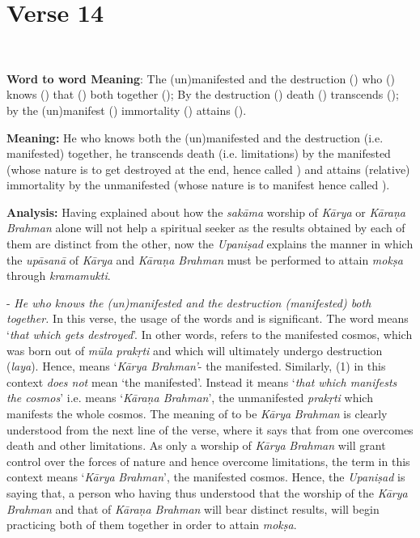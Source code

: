 \chapter{Verse 14}

\begin{moolashloka}
\\
\end{moolashloka}

\textbf{Word to word Meaning}: The (un)manifested and the destruction () who () knows () that () both together (); By the destruction () death () transcends (); by the (un)manifest () immortality () attains ().

\textbf{Meaning:} He who knows both the (un)manifested and the destruction (i.e. manifested) together, he transcends death (i.e. limitations) by the manifested (whose nature is to get destroyed at the end, hence called ) and attains (relative) immortality by the unmanifested (whose nature is to manifest hence called ).

\textbf{Analysis:} Having explained about how the \emph{sakāma} worship of \emph{Kārya} or \emph{Kāraṇa Brahman} alone will not help a spiritual seeker as the results obtained by each of them are distinct from the other, now the \emph{Upaniṣad} explains the manner in which the \emph{upāsanā} of \emph{Kārya} and \emph{Kāraṇa Brahman} must be performed to attain \emph{mokṣa} through \emph{kramamukti}.

- \emph{He who knows the (un)manifested and the destruction (manifested) both together.} In this verse, the usage of the words  and  is significant. The word  means `\emph{that which gets destroyed}'. In other words,  refers to the manifested cosmos, which was born out of \emph{mūla prakṛti} and which will ultimately undergo destruction (\emph{laya}). Hence,  means `\emph{Kārya} \emph{Brahman'}- the manifested. Similarly,  (1) in this context \emph{does not} mean `the manifested'. Instead it means `\emph{that which manifests the cosmos}' i.e.  means `\emph{Kāraṇa Brahman}', the unmanifested \emph{prakṛti} which manifests the whole cosmos. The meaning of  to be \emph{Kārya} \emph{Brahman} is clearly understood from the next line of the verse, where it says that from  one overcomes death and other limitations. As only a worship of \emph{Kārya} \emph{Brahman} will grant control over the forces of nature and hence overcome limitations, the term  in this context means `\emph{Kārya} \emph{Brahman}', the manifested cosmos. Hence, the \emph{Upaniṣad} is saying that, a person who having thus understood that the worship of the \emph{Kārya} \emph{Brahman} and that of \emph{Kāraṇa Brahman} will bear distinct results, will begin practicing both of them together in order to attain \emph{mokṣa}.


